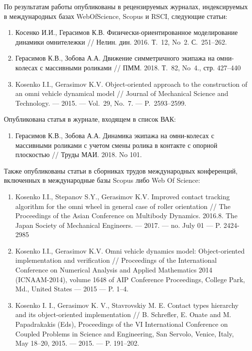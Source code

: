 По результатам работы опубликованы в рецензируемых журналах, индексируемых в международных базах WebOfScience, Scopus и RSCI, следующие статьи:

\begin{enumerate}
    \item Косенко И.И., Герасимов К.В. Физически-ориентированное моделирование динамики омнитележки // Нелин. дин. 2016. Т.~12, No~2. С.~251--262.
    \item Герасимов К.В., Зобова А.А. Движение симметричного экипажа на омни-колесах с массивными роликами // ПММ. 2018. Т.~82, No~4., стр. 427--440
    \item Kosenko I.I., Gerasimov K.V. Object-oriented approach to the cons\-truc\-tion of an omni vehicle dynamical model // Journal of Mechanical Science and Technology. — 2015. — Vol.~29, No.~7. — P.~2593--2599.
\end{enumerate}
Опубликована статья в журнале, входящем в список ВАК:
\begin{enumerate}
    \addtocounter{enumi}{3}
    \item Герасимов К.В., Зобова А.А. Динамика экипажа на омни-ко\-ле\-сах с массивными роликами с учетом смены ролика в контакте с опорной плоскостью // Труды МАИ. 2018. No 101.
\end{enumerate}
Также опубликованы статьи в сборниках трудов международных конференций, включенных в международные базы Scopus либо Web Of Science:
\begin{enumerate}
    \addtocounter{enumi}{4}
    \item Kosenko I.I., Stepanov S.Y., Gerasimov K.V. Improved contact tracking algorithm for the omni wheel in general case of roller orientation // The Proceedings of the Asian Conference on Multi\-bo\-dy Dynamics. 2016.8. The Japan Society of Mechanical Engineers. — 2017. — no. July 01 — P. 2424-2985
    \item Kosenko I.I., Gerasimov K.V. Omni vehicle dynamics model: Object-oriented implementation and verification // Proceedings of the International Conference on Numerical Analysis and Applied Mathe\-ma\-tics 2014 (ICNAAM-2014), volume 1648 of AIP Conference Pro\-cee\-dings, College Park, Md., United States — 2015 — P. 1–4.
    \item Kosenko I. I., Gerasimov K. V., Stavrovskiy M. E. Contact types hierarchy and its object-oriented implementation // B. Schrefler, E. Onate and M. Papadrakakis (Eds), Proceedings of the VI Inter\-na\-tional Conference on Coupled Problems in Science and Engineering, San Servolo, Venice, Italy, May 18–20, 2015. — 2015. — P. 191–202.
\end{enumerate}
